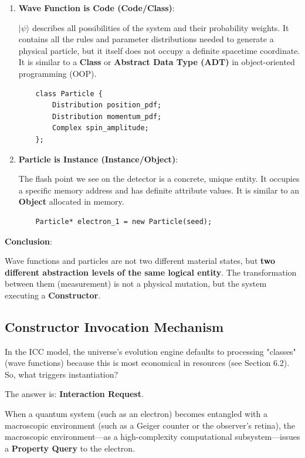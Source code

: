 \begin{enumerate}
\item \textbf{Wave Function is Code (Code/Class)}:

    $|\psi\rangle$ describes all possibilities of the system and their probability weights. It contains all the rules and parameter distributions needed to generate a physical particle, but it itself does not occupy a definite spacetime coordinate. It is similar to a \textbf{Class} or \textbf{Abstract Data Type (ADT)} in object-oriented programming (OOP).

    \begin{verbatim}
    class Particle {
        Distribution position_pdf;
        Distribution momentum_pdf;
        Complex spin_amplitude;
    };
    \end{verbatim}

\item \textbf{Particle is Instance (Instance/Object)}:

    The flash point we see on the detector is a concrete, unique entity. It occupies a specific memory address and has definite attribute values. It is similar to an \textbf{Object} allocated in memory.

    \begin{verbatim}
    Particle* electron_1 = new Particle(seed);
    \end{verbatim}
\end{enumerate}

\textbf{Conclusion}:

Wave functions and particles are not two different material states, but \textbf{two different abstraction levels of the same logical entity}. The transformation between them (measurement) is not a physical mutation, but the system executing a \textbf{Constructor}.

\subsection{Constructor Invocation Mechanism}

In the ICC model, the universe's evolution engine defaults to processing "classes" (wave functions) because this is most economical in resources (see Section 6.2). So, what triggers instantiation?

The answer is: \textbf{Interaction Request}.

When a quantum system (such as an electron) becomes entangled with a macroscopic environment (such as a Geiger counter or the observer's retina), the macroscopic environment—as a high-complexity computational subsystem—issues a \textbf{Property Query} to the electron.

